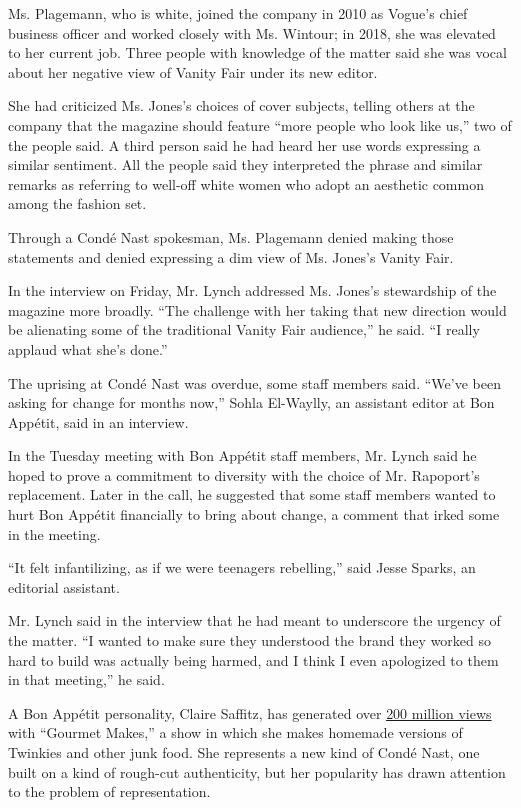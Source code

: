 Ms. Plagemann, who is white, joined the company in 2010 as Vogue's chief
business officer and worked closely with Ms. Wintour; in 2018, she was
elevated to her current job. Three people with knowledge of the matter
said she was vocal about her negative view of Vanity Fair under its new
editor.

She had criticized Ms. Jones's choices of cover subjects, telling others
at the company that the magazine should feature ``more people who look
like us,'' two of the people said. A third person said he had heard her
use words expressing a similar sentiment. All the people said they
interpreted the phrase and similar remarks as referring to well-off
white women who adopt an aesthetic common among the fashion set.

Through a Condé Nast spokesman, Ms. Plagemann denied making those
statements and denied expressing a dim view of Ms. Jones's Vanity Fair.

In the interview on Friday, Mr. Lynch addressed Ms. Jones's stewardship
of the magazine more broadly. ``The challenge with her taking that new
direction would be alienating some of the traditional Vanity Fair
audience,'' he said. ``I really applaud what she's done.''

The uprising at Condé Nast was overdue, some staff members said. ``We've
been asking for change for months now,'' Sohla El-Waylly, an assistant
editor at Bon Appétit, said in an interview.

In the Tuesday meeting with Bon Appétit staff members, Mr. Lynch said he
hoped to prove a commitment to diversity with the choice of Mr.
Rapoport's replacement. Later in the call, he suggested that some staff
members wanted to hurt Bon Appétit financially to bring about change, a
comment that irked some in the meeting.

``It felt infantilizing, as if we were teenagers rebelling,'' said Jesse
Sparks, an editorial assistant.

Mr. Lynch said in the interview that he had meant to underscore the
urgency of the matter. ``I wanted to make sure they understood the brand
they worked so hard to build was actually being harmed, and I think I
even apologized to them in that meeting,'' he said.

A Bon Appétit personality, Claire Saffitz, has generated over
\href{https://www.buzzfeednews.com/article/laurenstrapagiel/bon-appetit-test-kitchen-youtube-brad-claire}{200
million views} with ``Gourmet Makes,'' a show in which she makes
homemade versions of Twinkies and other junk food. She represents a new
kind of Condé Nast, one built on a kind of rough-cut authenticity, but
her popularity has drawn attention to the problem of representation.

